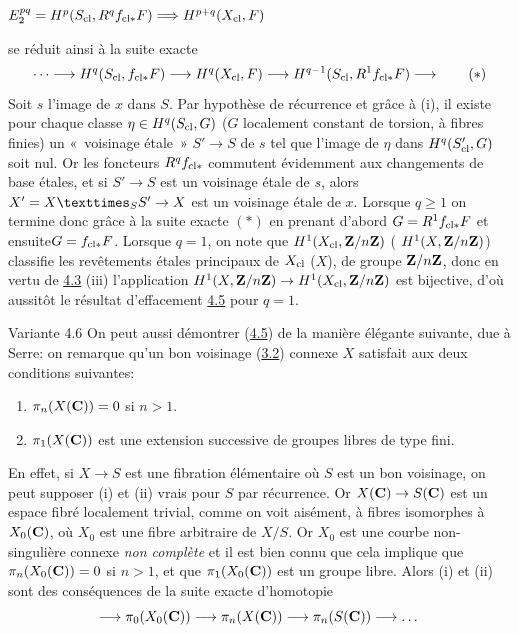 \documentclass[10pt]{../fichiers-configuration-latex/smfart}
\begin{document}
$E^{pq}_2=H^p(S_{\operatorname{cl}}, R^qf_{\operatorname{cl}\!\ast}F)\Longrightarrow
H^{p+q}(X_{\operatorname{cl}},F)$

\noindent
se réduit ainsi à la suite exacte
\begin{equation*}
\dots\longrightarrow H^q(S_{\operatorname{cl}},f_{\operatorname{cl}\!\ast}F)\longrightarrow
H^q(X_{\operatorname{cl}},F)\longrightarrow H^{q-1}(S_{\operatorname{cl}},
R^1f_{\operatorname{cl}\!\ast}F)\longrightarrow\tag{$\ast$}
\end{equation*}
Soit $s$ l'image de $x$ dans $S$. Par hypothèse de récurrence et grâce
à (i), il existe pour chaque classe $\eta\in H^q(S_{\operatorname{cl}},G)$ ($G$
localement constant de torsion, à fibres finies) un « voisinage
étale » $S'\rightarrow S$ de $s$ tel que l'image de $\eta$ dans
$H^q(S'_{\operatorname{cl}},G)$ soit nul. Or les foncteurs $R^qf_{\operatorname{cl}\!\ast}$
commutent évidemment aux changements de base étales, et si
$S'\rightarrow S$ est un voisinage étale de $s$, alors
$X'=\fprod{X}{S'}{S}\rightarrow X$ est un voisinage étale de
$x$. Lorsque $q\geq 1$ on termine donc grâce à la suite exacte
$(\ast)$ en prenant d'abord $G=R^1f_{\operatorname{cl}\!\ast}F$ et
ensuite\pageoriginale $G=f_{\operatorname{cl}\!\ast}F$. %
Lorsque $q=1$, on note que
$H^1(X_{\operatorname{cl}},\mathbf{Z}/n \mathbf{Z})$ (\resp
$H^1(X,\mathbf{Z}/n\mathbf{Z})$) classifie les revêtements étales %
principaux de $X_{\operatorname{cl}}$ (\resp $X$), de groupe
$\mathbf{Z}/n\mathbf{Z}$, donc en vertu de \hyperref[XI.thm4.3]{4.3} (iii) l'application
$H^1(X,\mathbf{Z}/n\mathbf{Z})\rightarrow
H^1(X_{\operatorname{cl}},\mathbf{Z}/n\mathbf{Z})$ est bijective, d'où aussitôt le
résultat d'effacement \hyperref[XI.lem4.5]{4.5} pour $q=1$.

\begin{enonce*}[remark]{Variante 4.6}
On peut aussi démontrer (\hyperref[XI.lem4.5]{4.5}) de la manière élégante suivante, due à
Serre: on remarque qu'un bon voisinage (\hyperref[XI.def3.2]{3.2}) connexe $X$ satisfait aux
deux conditions suivantes:
\begin{enumerate}
\renewcommand{\theenumi}{\roman{enumi}}
\renewcommand{\labelenumi}{(\theenumi)}
\item $\pi_n(X(\mathbf{C}))=0$ si $n>1$.

\item $\pi_1(X(\mathbf{C}))$ est une extension successive de groupes
libres de type fini.
\end{enumerate}
\end{enonce*}

En effet, si $X\rightarrow S$ est une fibration élémentaire où $S$ est
un bon voisinage, on peut supposer (i) et (ii) vrai{s} pour $S$ par
récurrence. Or $X(\mathbf{C})\rightarrow S(\mathbf{C})$ est un espace
fibré localement trivial, comme on voit aisément, à fibres isomorphes
à $X_0(\mathbf{C})$, où $X_0$ est une fibre arbitraire de
$X/S$. Or $X_0$ est une courbe non-singulière connexe \emph{non
complète} et il est bien connu que cela implique que
$\pi_n(X_0(\mathbf{C}))=0$ si $n>1$, et que
$\pi_1(X_0(\mathbf{C}))$ est un groupe libre. %
Alors (i) et (ii)
sont des conséquences de la suite exacte d'homotopie
$$
\longrightarrow \pi_0(X_0(\mathbf{C}))\longrightarrow
\pi_n (X(\mathbf{C}))\longrightarrow \pi_n
(S(\mathbf{C}))\longrightarrow\dots
$$
\end{document}
